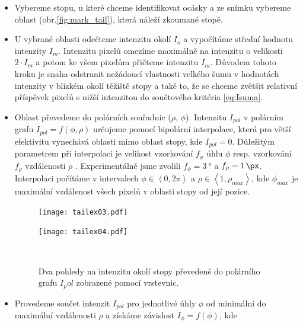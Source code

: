 	\begin{itemize}
	\item Vybereme stopu, u které chceme identifikovat ocásky a ze snímku vybereme oblast (obr.\ref{fig:mark_tail}), která náleží zkoumané stopě. 
	
	\item U vybrané oblasti odečteme intenzitu okolí $I_o$ a vypočítáme střední hodnotu intenzity $I_m$. Intenzitu pixelů omezíme maximálně na intenzitu o velikosti $2\cdot I_m$ a potom ke všem pixelům přičteme intenzitu $I_m$. Důvodem tohoto kroku je snaha odstranit nežádoucí vlastnosti velkého šumu v hodnotách intenzity v blízkém okolí těžiště stopy a také to, že se chceme zvětšit relativní příspěvek pixelů s nižší intenzitou do součtového kritéria \ref{eq:Isuma}.   
	
	\item Oblast převedeme do polárních souřadnic ($\rho$, $\phi$). Intenzitu $I_{pol}$ v polárním grafu $I_{pol} = f(\phi,\rho)$ určujeme pomocí bipolární interpolace, která pro větší efektivitu vynechává oblasti mimo oblast stopy, kde $I_{pol} = 0$. Důležitým parametrem při interpolaci je velikost vzorkování $f_{\phi}$ úhlu $\phi$ resp. vzorkování $f_{\rho}$ vzdálenosti $\rho$ . Experimentálně jsme zvolili $f_{\phi} = \SI{3}{\degree}$ a $f_{\rho} = \SI{1}{\px}$. Interpolaci počítáme v intervalech  $\phi \in \left\langle 0,2\pi \right\rangle$ a $\rho \in \left\langle 1,\rho_{max} \right\rangle$, kde $\phi_{max}$ je maximální vzdálenost všech pixelů v oblasti stopy od její pozice.  
	
	\begin{figure}[htps]
    \centering
    \begin{minipage}[c]{0.48\textwidth}
        \centering\texttt{[image: tailex03.pdf]}
    \end{minipage}
    \begin{minipage}[c]{0.48\textwidth}
        \centering\texttt{[image: tailex04.pdf]}
    \end{minipage}
    \\
        \caption[Detektor ocásků - polární graf.]{Dva pohledy na intenzitu okolí stopy převedené do polárního grafu $I_pol$ zobrazené pomocí vrstevnic.}
        \label{Detekce}
\end{figure}
	
	\item Provedeme součet intenzit $I_{pol}$ pro jednotlivé úhly $\phi$ od minimální do maximální vzdálenosti $\rho$ a získáme závislost $I_\phi = f(\phi)$, kde  
	

\end{itemize}
